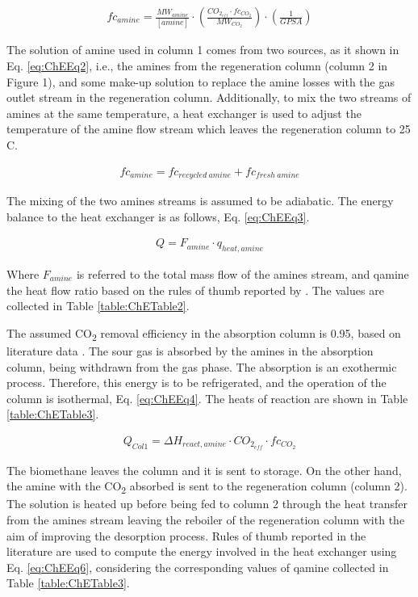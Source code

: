 \begin{refsection}[referencesCh7]
\begin{align}
fc_{amine} = \frac{{MW}_{amine}}{\left[ {amine} \right]}\cdot\left( \frac{CO_{2_{eff}} \cdot fc_{CO_2}}{MW_{CO_2}} \right)\cdot\left( {\frac{1}{{{{GPSA}}}}} \right)  \label{eq:ChEEq1}
\end{align}

The solution of amine used in column 1 comes from two sources, as it shown in Eq. \ref{eq:ChEEq2}, i.e., the amines from the regeneration column (column 2 in Figure 1), and some make-up solution to replace the amine losses with the gas outlet stream in the regeneration column. Additionally, to mix the two streams of amines at the same temperature, a heat exchanger is used to adjust the temperature of the amine flow stream which leaves the regeneration column to 25 \textdegree C.

\begin{align}
fc_{amine} =  fc_{recycled \ amine}  + fc_{fresh \ amine} \label{eq:ChEEq2}
\end{align}

The mixing of the two amines streams is assumed to be adiabatic. The energy balance to the heat exchanger is as follows, Eq. \ref{eq:ChEEq3}.

\begin{align}
Q = F_{amine} \cdot q_{heat,amine} \label{eq:ChEEq3}
\end{align}

Where $F_{amine}$ is referred to the total mass flow of the amines stream, and qamine the heat flow ratio based on the rules of thumb reported by \citet{2012gpsa}. The values are collected in Table \ref{table:ChETable2}.	

The assumed CO\textsubscript{2} removal efficiency in the absorption column is 0.95, based on literature data \citep{zhang2013modeling}. The sour gas is absorbed by the amines in the absorption column, being withdrawn from the gas phase. The absorption is an exothermic process. Therefore, this energy is to be refrigerated, and the operation of the column is isothermal, Eq. \ref{eq:ChEEq4}. The heats of reaction are shown in Table \ref{table:ChETable3}.

\begin{align}
Q_{Col1} = \Delta H_{react, amine} \cdot CO_{2_{eff}} \cdot fc_{CO_2} \label{eq:ChEEq4}
\end{align}

The biomethane leaves the column and it is sent to storage. On the other hand, the amine with the CO\textsubscript{2} absorbed is sent to the regeneration column (column 2). The solution is heated up before being fed to column 2 through the heat transfer from the amines stream leaving the reboiler of the regeneration column with the aim of improving the desorption process. Rules of thumb reported in the literature are used to compute the energy involved in the heat exchanger using Eq. \ref{eq:ChEEq6}, considering the corresponding values of qamine collected in Table \ref{table:ChETable3}. 


\end{refsection}
